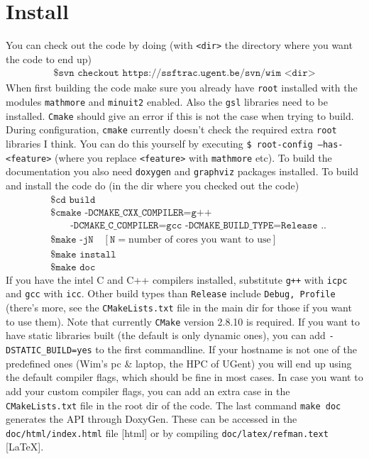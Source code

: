 \section{Install}
You can check out the code by doing (with \texttt{<dir>} the directory where 
you want the code to end up)
\begin{align*}
	\texttt{\$ svn checkout https://ssftrac.ugent.be/svn/wim <dir>}
\end{align*}
When first building the code make sure you already have \texttt{root} installed 
with the modules \texttt{mathmore} and 
\texttt{minuit2} enabled.  Also the \texttt{gsl} libraries need to be 
installed. \texttt{Cmake} should give an error if this is not the case when 
trying to build. During configuration, \texttt{cmake} currently doesn't check 
the required extra \texttt{root} libraries I think.  You can do this yourself 
by executing \texttt{\$ root-config --has-<feature>} (where you replace 
\texttt{<feature>} with \texttt{mathmore} etc). To build the documentation you 
also need \texttt{doxygen} and \texttt{graphviz} packages installed. To build 
and install the code do (in the dir where you checked 
out the code)
\begin{align*}
    & \texttt{\$ cd build} \\
	& \texttt{\$ cmake -DCMAKE\_CXX\_COMPILER=g++}\\
 &\qquad \texttt{-DCMAKE\_C\_COMPILER=gcc 
-DCMAKE\_BUILD\_TYPE=Release ..} \\
	& \texttt{\$ make -jN}\quad [\texttt{N}= \text{number of cores you want 
to use}]\\
	& \texttt{\$ make install } \\
	& \texttt{\$ make doc } 
\end{align*}
If you have the intel C and C++ compilers installed, substitute \texttt{g++} 
with \texttt{icpc} and \texttt{gcc} with \texttt{icc}.  Other build types than 
\texttt{Release} include \texttt{Debug, Profile} (there's more, see the 
\texttt{CMakeLists.txt} file in the main dir for those if you want to use 
them). 
Note that currently \texttt{CMake} version 2.8.10 is required.  If you want to 
have static libraries built (the default is only dynamic ones), you can add 
\texttt{-DSTATIC\_BUILD=yes} to the first commandline.
If your hostname is not one of 
the predefined ones (Wim's pc \& laptop, the HPC of UGent) you will end up 
using the default compiler flags, which should be fine in most cases.  In case 
you want to add your custom compiler flags, you can add an extra case in the 
\texttt{CMakeLists.txt} file in the root dir of the code.  The last command 
\texttt{make doc} generates the API through DoxyGen.  These can be accessed in 
the \texttt{doc/html/index.html} file [html] or by compiling 
\texttt{doc/latex/refman.text} [\LaTeX].

